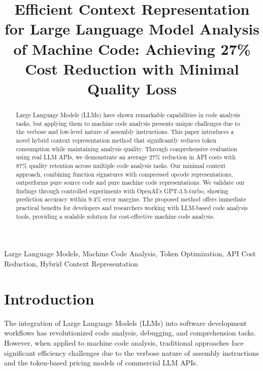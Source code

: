 \documentclass[conference]{IEEEtran}
\begin{document}
\title{Efficient Context Representation for Large Language Model Analysis of Machine Code: Achieving 27\% Cost Reduction with Minimal Quality Loss}

\author{
}

\maketitle

\begin{abstract}
Large Language Models (LLMs) have shown remarkable capabilities in code analysis tasks, but applying them to machine code analysis presents unique challenges due to the verbose and low-level nature of assembly instructions. This paper introduces a novel hybrid context representation method that significantly reduces token consumption while maintaining analysis quality. Through comprehensive evaluation using real LLM APIs, we demonstrate an average 27\% reduction in API costs with 87\% quality retention across multiple code analysis tasks. Our minimal context approach, combining function signatures with compressed opcode representations, outperforms pure source code and pure machine code representations. We validate our findings through controlled experiments with OpenAI's GPT-3.5-turbo, showing prediction accuracy within 9.4\% error margins. The proposed method offers immediate practical benefits for developers and researchers working with LLM-based code analysis tools, providing a scalable solution for cost-effective machine code analysis.
\end{abstract}

\begin{IEEEkeywords}
Large Language Models, Machine Code Analysis, Token Optimization, API Cost Reduction, Hybrid Context Representation
\end{IEEEkeywords}

\section{Introduction}

The integration of Large Language Models (LLMs) into software development workflows has revolutionized code analysis, debugging, and comprehension tasks. However, when applied to machine code analysis, traditional approaches face significant efficiency challenges due to the verbose nature of assembly instructions and the token-based pricing models of commercial LLM APIs.
\end{document}
